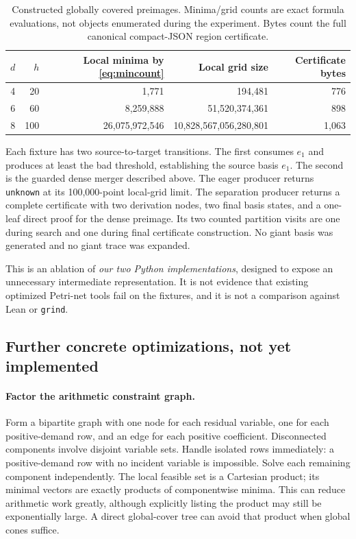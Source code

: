 \documentclass[11pt,a4paper]{article}
\theoremstyle{definition}
\newcommand{\code}[1]{\texttt{#1}}
\begin{document}
\begin{table}[htbp]
\centering\small
\begin{tabular}{@{}rrrrr@{}}
\toprule
$d$ & $h$ & Local minima by \eqref{eq:mincount} & Local grid size & Certificate bytes\\
\midrule
4&20&1,771&194,481&776\\
6&60&8,259,888&51,520,374,361&898\\
8&100&26,075,972,546&10,828,567,056,280,801&1,063\\
\bottomrule
\end{tabular}
\caption{Constructed globally covered preimages. Minima/grid counts are exact formula evaluations, not objects enumerated during the experiment. Bytes count the full canonical compact-JSON region certificate.}
\label{tab:ablation}
\end{table}

Each fixture has two source-to-target transitions. The first consumes $e_1$
and produces at least the bad threshold, establishing the source basis
$e_1$. The second is the guarded dense merger described above. The eager
producer returns \code{unknown} at its 100,000-point local-grid limit. The
separation producer returns a complete certificate with two derivation nodes,
two final basis states, and a one-leaf direct proof for the dense preimage.
Its two counted partition visits are one during search and one during final
certificate construction. No giant basis was generated and no giant trace
was expanded.

This is an ablation of \emph{our two Python implementations}, designed to
expose an unnecessary intermediate representation. It is not evidence that
existing optimized Petri-net tools fail on the fixtures, and it is not a
comparison against Lean or \code{grind}.

\subsection{Further concrete optimizations, not yet implemented}
\paragraph{Factor the arithmetic constraint graph.}
Form a bipartite graph with one node for each residual variable, one for each
positive-demand row, and an edge for each positive coefficient. Disconnected
components involve disjoint variable sets. Handle isolated rows immediately:
a positive-demand row with no incident variable is impossible. Solve each
remaining component independently. The local feasible set is a Cartesian
product; its minimal vectors are exactly products of componentwise minima.
This can reduce arithmetic work greatly, although explicitly listing the
product may still be exponentially large. A direct global-cover tree can
avoid that product when global cones suffice.
\end{document}
